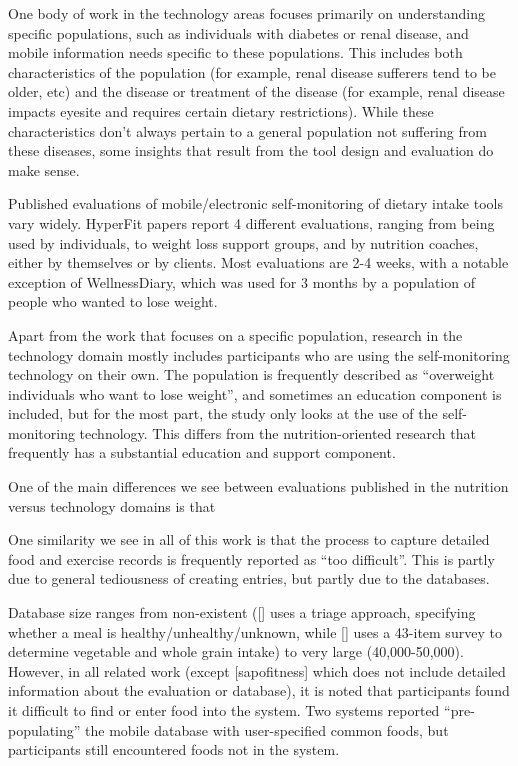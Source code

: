 One body of work in the technology areas focuses primarily on understanding specific populations, such as individuals with diabetes or renal disease, and mobile information needs specific to these populations. This includes both characteristics of the population (for example, renal disease sufferers tend to be older, etc) and the disease or treatment of the disease (for example, renal disease impacts eyesite and requires certain dietary restrictions). While these characteristics don't always pertain to a general population not suffering from these diseases, some insights that result from the tool design and evaluation do make sense. 

Published evaluations of mobile/electronic self-monitoring of dietary intake tools vary widely. HyperFit papers report 4 different evaluations, ranging from being used by individuals, to weight loss support groups, and by nutrition coaches, either by themselves or by clients. Most evaluations are 2-4 weeks, with a notable exception of WellnessDiary, which was used for 3 months by a population of people who wanted to lose weight. 

Apart from the work that focuses on a specific population, research in the technology domain mostly includes participants who are using the self-monitoring technology on their own. The population is frequently described as ``overweight individuals who want to lose weight'', and sometimes an education component is included, but for the most part, the study only looks at the use of the self-monitoring technology. This differs from the nutrition-oriented research that frequently has a substantial education and support component. 

One of the main differences we see between evaluations published in the nutrition versus technology domains is that 

One similarity we see in all of this work is that the process to capture detailed food and exercise records is frequently reported as ``too difficult''. This is partly due to general tediousness of creating entries, but partly due to the databases. 

Database size ranges from non-existent ([] uses a triage approach, specifying whether a meal is healthy/unhealthy/unknown, while [] uses a 43-item survey to determine vegetable and whole grain intake) to very large (40,000-50,000). However, in all related work (except [sapofitness] which does not include detailed information about the evaluation or database), it is noted that participants found it difficult to find or enter food into the system. Two systems reported ``pre-populating'' the mobile database with user-specified common foods, but participants still encountered foods not in the system. 

